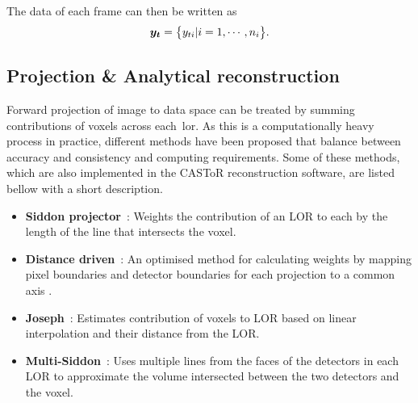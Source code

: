The data of each frame can then be written as
\begin{equation}
   \bm{y_t} = \big\{ {y_{ti}| i=1,\cdots,n_i} \big\} \\.
\end{equation}
%
\subsection{Projection \& Analytical reconstruction}
Forward projection of image to data space can be treated by summing contributions of voxels across each~\gls{lor}. %
As this is a computationally heavy process in practice, different methods have been proposed that balance between accuracy and consistency and computing requirements. %
Some of these methods, which are also implemented in the CASToR reconstruction software, are listed bellow with a short description.
\begin{itemize}
\item  \textbf{Siddon projector}~\cite{Siddon1985}: Weights the contribution of an LOR to each by the length of the line that intersects the voxel.
\item  \textbf{Distance driven}~\cite{DeMan2004}: An optimised method for calculating weights by mapping pixel boundaries and detector boundaries for each projection to a common axis .
\item  \textbf{Joseph}~\cite{Joseph1982}: Estimates contribution of voxels to LOR based on linear interpolation and their distance from the LOR. 
\item  \textbf{Multi-Siddon}~\cite{Moehrs2008}: Uses multiple lines from the faces of the detectors in each LOR to approximate the volume intersected between the two detectors and the voxel.
\end{itemize}

